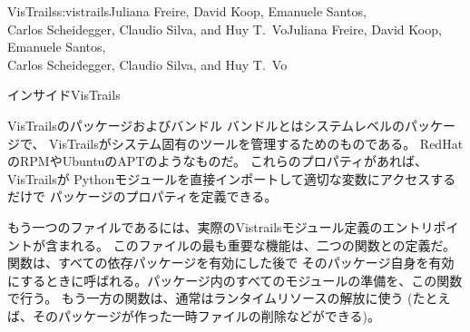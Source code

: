 \begin{aosachaptertoc}{VisTrails}{s:vistrails}{Juliana Freire, David Koop, Emanuele Santos, \\ Carlos Scheidegger, Claudio Silva, and Huy T.\ Vo}{Juliana Freire, David Koop, Emanuele Santos, \\ \hspace*{0.9cm} Carlos Scheidegger, Claudio Silva, and Huy T.\ Vo}
\begin{aosasect1}{インサイドVisTrails}
\begin{aosasect2}{VisTrailsのパッケージおよびバンドル}
バンドルとはシステムレベルのパッケージで、
VisTrailsがシステム固有のツールを管理するためのものである。
RedHatのRPMやUbuntuのAPTのようなものだ。
これらのプロパティがあれば、VisTrailsが
Pythonモジュールを直接インポートして適切な変数にアクセスするだけで
パッケージのプロパティを定義できる。

もう一つのファイルであるには、実際のVistrailsモジュール定義のエントリポイントが含まれる。
このファイルの最も重要な機能は、二つの関数との定義だ。
関数は、すべての依存パッケージを有効にした後で
そのパッケージ自身を有効にするときに呼ばれる。パッケージ内のすべてのモジュールの準備を、この関数で行う。
もう一方の関数は、通常はランタイムリソースの解放に使う
(たとえば、そのパッケージが作った一時ファイルの削除などができる)。


\end{aosasect2}
\end{aosasect1}
\end{aosachaptertoc}
